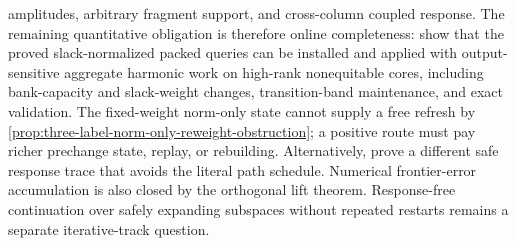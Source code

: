 amplitudes, arbitrary fragment support, and cross-column coupled response.  The
remaining quantitative
obligation is therefore online completeness: show that the proved
slack-normalized packed queries can be installed and applied with
output-sensitive aggregate harmonic work on high-rank nonequitable cores,
including bank-capacity and slack-weight changes, transition-band maintenance,
and exact validation.  The fixed-weight norm-only state cannot supply a free
refresh by \cref{prop:three-label-norm-only-reweight-obstruction}; a positive
route must pay richer prechange state, replay, or rebuilding.  Alternatively,
prove a different safe response trace
that avoids the literal path schedule.
Numerical
frontier-error accumulation is also closed by
the orthogonal lift theorem.  Response-free continuation over safely expanding
subspaces without repeated restarts remains a separate iterative-track
question.
